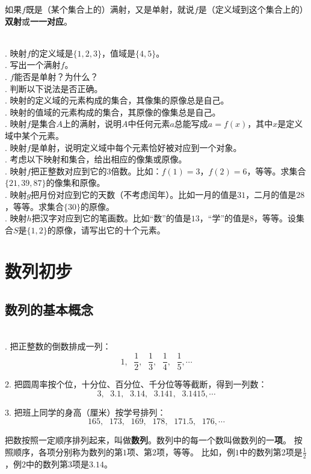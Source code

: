 \documentclass[12pt,UTF8]{ctexbook}
\begin{document}
如果$f$既是（某个集合上的）满射，又是单射，就说$f$是（定义域到这个集合上的）\textbf{双射}或\textbf{一一对应}。

\begin{xt}\label{xt:2-2-0}
    \mbox{} \\
    . 映射$f$的定义域是$\{1,2,3\}$，值域是$\{4,5\}$。\\
    . 写出一个满射$f$。\\
    . $f$能否是单射？为什么？\\
    . 判断以下说法是否正确。\\
    . 映射的定义域的元素构成的集合，其像集的原像总是自己。\\
    . 映射的值域的元素构成的集合，其原像的像集总是自己。\\
    . 映射$f$是集合$A$上的满射，说明$A$中任何元素$a$总能写成$a = f(x)$，其中$x$是定义域中某个元素。\\
    . 映射$f$是单射，说明定义域中每个元素恰好被对应到一个对象。\\ 
    . 考虑以下映射和集合，给出相应的像集或原像。\\
    . 映射$f$把正整数对应到它的$3$倍数。比如：$f(1) = 3$，$f(2) = 6$，等等。求集合$\{21, 39, 87\}$的像集和原像。\\
    . 映射$g$把月份对应到它的天数（不考虑闰年）。比如一月的值是$31$，二月的值是$28$，等等。求集合$\{30\}$的原像。\\
    . 映射$h$把汉字对应到它的笔画数。比如“数”的值是$13$，“学”的值是$8$，等等。设集合$S$是$\{1,2\}$的原像，请写出它的十个元素。 %
\end{xt}

\chapter{数列初步}

\section{数列的基本概念}

\begin{ex}
    \mbox{}\\
    . 把正整数的倒数排成一列：
$$ 1,\;\,\, \frac{1}{2}, \;\,\, \frac{1}{3}, \;\,\,\frac{1}{4}, \;\,\,\frac{1}{5}, \cdots $$

2. 把圆周率按个位，十分位、百分位、千分位等等截断，得到一列数：
$$  3,\;\,\, 3.1,\;\,\, 3.14,\;\,\, 3.141,\;\,\, 3.1415, \cdots   $$

    3. 把班上同学的身高（厘米）按学号排列：
$$ 165,\;\,\, 173,\;\,\, 169,\;\,\, 178, \;\,\,171.5,\;\,\, 176, \cdots  $$
\end{ex}
把数按照一定顺序排列起来，叫做\textbf{数列}。数列中的每一个数叫做数列的一\textbf{项}。
按照顺序，各项分别称为数列的第$1$项、第$2$项，等等。
比如，例$1$中的数列第$2$项是$\frac{1}{2}$，例$2$中的数列第$3$项是$3.14$。
\end{document}
